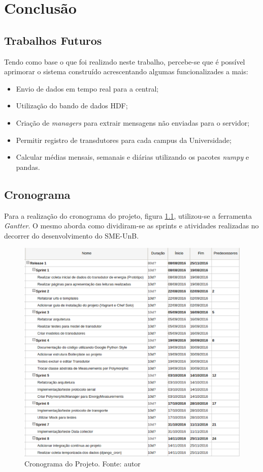 \chapter{Conclusão}

\section{Trabalhos Futuros}
Tendo como base o que foi realizado neste trabalho, percebe-se que é possível aprimorar o sistema construído acrescentando algumas funcionalizades a mais:
\begin{itemize}
    \item Envio de dados em tempo real para a central;
    \item Utilização do bando de dados HDF;
    \item Criação de \textit{managers} para extrair mensagens não enviadas para o servidor;
    \item Permitir registro de transdutores para cada campus da Universidade;
    \item Calcular médias mensais, semanais e diárias utilizando os pacotes \textit{numpy} e {pandas}.
\end{itemize}

\section{Cronograma}
Para a realização do cronograma do projeto, figura \ref{cronograma}, utilizou-se a ferramenta \textit{Gantter}. O mesmo aborda como dividiram-se as sprints e atividades realizadas no decorrer do desenvolvimento do SME-UnB.

\begin{figure}[!htpb]
    \centering
    \includegraphics[keepaspectratio=true,scale=0.5]{figuras/cronograma.eps}
    \caption{Cronograma do Projeto. Fonte: autor}
    \label{cronograma}
\end{figure}